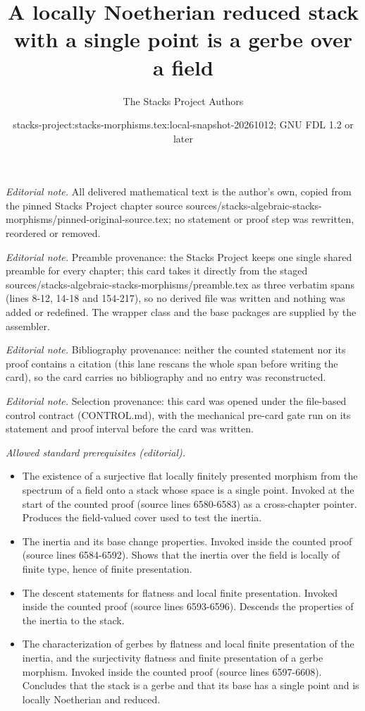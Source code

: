 \documentclass[10pt,a4paper]{amsart}
\title{A locally Noetherian reduced stack with a single point is a gerbe over a field}
\author{The Stacks Project Authors}
\date{stacks-project:stacks-morphisms.tex:local-snapshot-20261012; GNU FDL 1.2 or later}
\theoremstyle{plain}
\theoremstyle{definition}
\theoremstyle{remark}
\numberwithin{equation}{subsection}
\begin{document}
\maketitle
\noindent\textit{Editorial note.} All delivered mathematical text is the author's own, copied from the pinned Stacks Project chapter source sources/stacks-algebraic-stacks-morphisms/pinned-original-source.tex; no statement or proof step was rewritten, reordered or removed.\par\medskip
\noindent\textit{Editorial note.} Preamble provenance: the Stacks Project keeps one single shared preamble for every chapter; this card takes it directly from the staged sources/stacks-algebraic-stacks-morphisms/preamble.tex as three verbatim spans (lines 8-12, 14-18 and 154-217), so no derived file was written and nothing was added or redefined. The wrapper class and the base packages are supplied by the assembler.\par\medskip
\noindent\textit{Editorial note.} Bibliography provenance: neither the counted statement nor its proof contains a citation (this lane rescans the whole span before writing the card), so the card carries no bibliography and no entry was reconstructed.\par\medskip
\noindent\textit{Editorial note.} Selection provenance: this card was opened under the file-based control contract (CONTROL.md), with the mechanical pre-card gate run on its statement and proof interval before the card was written.\par\medskip
\noindent\textit{Allowed standard prerequisites (editorial).}\begin{itemize}
\item The existence of a surjective flat locally finitely presented morphism from the spectrum of a field onto a stack whose space is a single point. Invoked at the start of the counted proof (source lines 6580-6583) as a cross-chapter pointer. Produces the field-valued cover used to test the inertia.
\item The inertia and its base change properties. Invoked inside the counted proof (source lines 6584-6592). Shows that the inertia over the field is locally of finite type, hence of finite presentation.
\item The descent statements for flatness and local finite presentation. Invoked inside the counted proof (source lines 6593-6596). Descends the properties of the inertia to the stack.
\item The characterization of gerbes by flatness and local finite presentation of the inertia, and the surjectivity flatness and finite presentation of a gerbe morphism. Invoked inside the counted proof (source lines 6597-6608). Concludes that the stack is a gerbe and that its base has a single point and is locally Noetherian and reduced.
\end{itemize}\medskip
\end{document}
